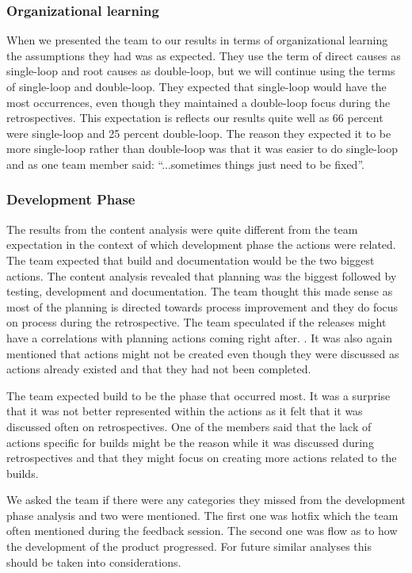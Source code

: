 \subsubsection{Organizational learning}
When we presented the team to our results in terms of organizational learning the assumptions they had was as expected. They use the term of direct causes as single-loop and root causes as double-loop, but we will continue using the terms of single-loop and double-loop. They expected that single-loop would have the most occurrences, even though they maintained a double-loop focus during the retrospectives. This expectation is reflects our results quite well as 66 percent were single-loop and 25 percent double-loop. The reason they expected it to be more single-loop rather than double-loop was that it was easier to do single-loop and as one team member said: ``...sometimes things just need to be fixed''. 

\subsubsection{Development Phase}
The results from the content analysis were quite different from the team expectation in the context of which development phase the actions were related. The team expected that build and documentation would be the two biggest actions. The content analysis revealed that planning was the biggest followed by testing, development and documentation. The team thought this made sense as most of the planning is directed towards process improvement and they do focus on process during the retrospective. The team speculated if the releases might have a correlations with planning actions coming right after. . It was also again mentioned that actions might not be created even though they were discussed as actions already existed and that they had not been completed. 

The team expected build to be the phase that occurred most. It was a surprise that it was not better represented within the actions as it felt that it was discussed often on retrospectives. One of the members said that the lack of actions specific for builds might be the reason while it was discussed during retrospectives and that they might focus on creating more actions related to the builds. 

We asked the team if there were any categories they missed from the development phase analysis and two were mentioned. The first one was hotfix which the team often mentioned during the feedback session. The second one was flow as to how the development of the product progressed. For future similar analyses this should be taken into considerations. 

